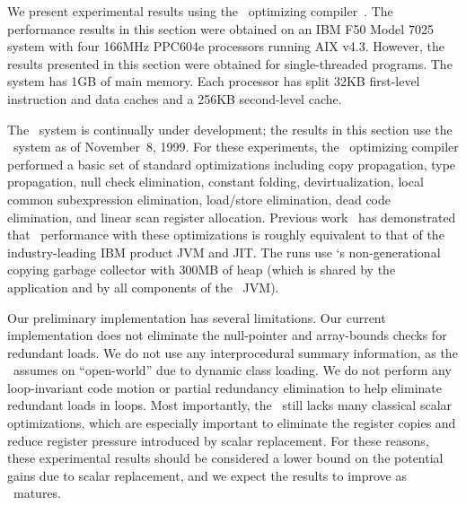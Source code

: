 We present experimental results using the \jp\ optimizing compiler~\cite{grande99}.
The performance results in this section were obtained on an
IBM F50 Model 7025 system
with four 166MHz PPC604e processors running AIX v4.3.
However, the results presented in this section were
obtained for single-threaded programs.
The system has 1GB of  main memory. 
Each processor has split 32KB first-level instruction and data
caches and a 256KB second-level cache. 

The \jp\ system is continually under development; the results in this
section use the \jp\ system as of November~8, 1999.  For these experiments,
the \jp\ optimizing compiler performed a basic set of 
standard optimizations
including copy propagation, type propagation, null check elimination, 
constant folding, devirtualization, local common subexpression elimination,
load/store elimination, dead code
elimination, and linear scan register allocation.  Previous work~\cite{grande99} has
demonstrated that \jp\ performance with these optimizations is roughly
equivalent to that of the industry-leading IBM product JVM and JIT.
The runs use \jp`s non-generational copying
garbage collector with 300MB of heap (which is shared by the application
and by all components of the \jp\ JVM).


Our preliminary implementation has several limitations.  
Our current implementation does 
not eliminate the null-pointer and array-bounds checks for redundant loads. 
We do not use any interprocedural
summary information, as the \joc\ assumes on ``open-world'' due to
dynamic class loading.  
We do not perform
any loop-invariant code motion or partial redundancy elimination 
to help eliminate redundant loads in loops.  Most importantly,
the \joc\ still lacks many classical scalar optimizations, which are
especially important to eliminate the register copies and reduce register
pressure introduced by scalar replacement.  For these reasons,
these experimental results should be considered a lower bound on
the potential gains due to scalar replacement, and we expect the
results to improve as \jp\ matures.


